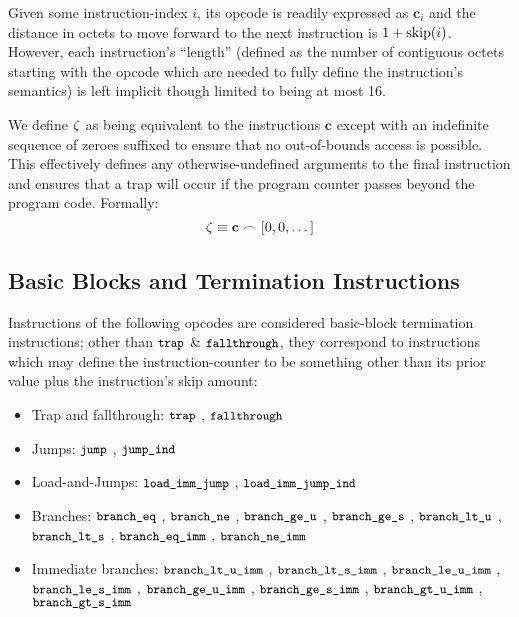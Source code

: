 Given some instruction-index $i$, its opcode is readily expressed as $\mathbf{c}_i$ and the distance in octets to move forward to the next instruction is $1 + \text{skip}(i)$. However, each instruction's ``length'' (defined as the number of contiguous octets starting with the opcode which are needed to fully define the instruction's semantics) is left implicit though limited to being at most 16.

We define $\zeta$ as being equivalent to the instructions $\mathbf{c}$ except with an indefinite sequence of zeroes suffixed to ensure that no out-of-bounds access is possible. This effectively defines any otherwise-undefined arguments to the final instruction and ensures that a trap will occur if the program counter passes beyond the program code. Formally:
\begin{equation}\label{eq:instructions}
  \instructions \equiv \mathbf{c} \concat \sq{0, 0, \dots}
\end{equation}

\subsection{Basic Blocks and Termination Instructions}

Instructions of the following opcodes are considered basic-block termination instructions; other than $\text{{\small \texttt{trap}}}$ \& $\text{{\small \texttt{fallthrough}}}$, they correspond to instructions which may define the instruction-counter to be something other than its prior value plus the instruction's skip amount:
\begin{itemize}
  \item Trap and fallthrough: $\text{{\small \texttt{trap}}}$
  , $\text{{\small \texttt{fallthrough}}}$
  \item Jumps: $\text{{\small \texttt{jump}}}$
  , $\text{{\small \texttt{jump\_ind}}}$
  \item Load-and-Jumps: $\text{{\small \texttt{load\_imm\_jump}}}$
  , $\text{{\small \texttt{load\_imm\_jump\_ind}}}$
  \item Branches: $\text{{\small \texttt{branch\_eq}}}$
  , $\text{{\small \texttt{branch\_ne}}}$
  , $\text{{\small \texttt{branch\_ge\_u}}}$
  , $\text{{\small \texttt{branch\_ge\_s}}}$
  , $\text{{\small \texttt{branch\_lt\_u}}}$
  , $\text{{\small \texttt{branch\_lt\_s}}}$
  , $\text{{\small \texttt{branch\_eq\_imm}}}$
  , $\text{{\small \texttt{branch\_ne\_imm}}}$
  \item Immediate branches: $\text{{\small \texttt{branch\_lt\_u\_imm}}}$
  , $\text{{\small \texttt{branch\_lt\_s\_imm}}}$
  , $\text{{\small \texttt{branch\_le\_u\_imm}}}$
  , $\text{{\small \texttt{branch\_le\_s\_imm}}}$
  , $\text{{\small \texttt{branch\_ge\_u\_imm}}}$
  , $\text{{\small \texttt{branch\_ge\_s\_imm}}}$
  , $\text{{\small \texttt{branch\_gt\_u\_imm}}}$
  , $\text{{\small \texttt{branch\_gt\_s\_imm}}}$
\end{itemize}

